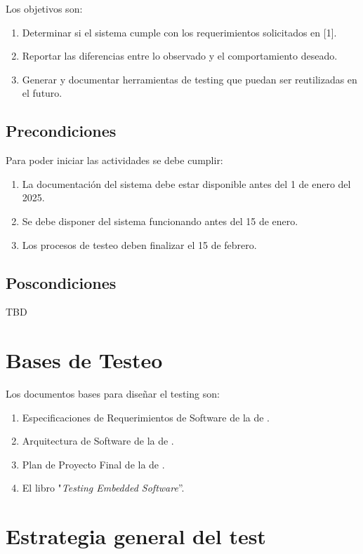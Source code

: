 \documentclass[
11pt, %
]{charter}
\begin{document}
Los objetivos son:
\begin{enumerate}
\item Determinar si el sistema cumple con los requerimientos solicitados en [1].
\item Reportar las diferencias entre lo observado y el comportamiento deseado.
\item Generar y documentar herramientas de testing que puedan ser reutilizadas en el futuro. 
\end{enumerate}

\subsection{Precondiciones}
\label{sec:org33cfcdb}

Para poder iniciar las actividades se debe cumplir:
\begin{enumerate}
\item La documentación del sistema debe estar disponible antes del 1 de enero del 2025.
\item Se debe disponer del sistema funcionando antes del 15 de enero.
\item Los procesos de testeo deben finalizar el 15 de febrero.
\end{enumerate}

\subsection{Poscondiciones}
\label{sec:org40573d1}

TBD

\section{Bases de Testeo}
Los documentos bases para diseñar el testing son:
\begin{enumerate}
\item Especificaciones de Requerimientos de Software de la \degreename de \authorname.
\item Arquitectura de Software de la \degreename de \authorname.
\item Plan de Proyecto Final de la \degreename de \authorname.
\item El libro "\textit{Testing Embedded Software}”.
\end{enumerate}

\section{Estrategia general del test}
\label{sec:orgfd5391f}
\end{document}
